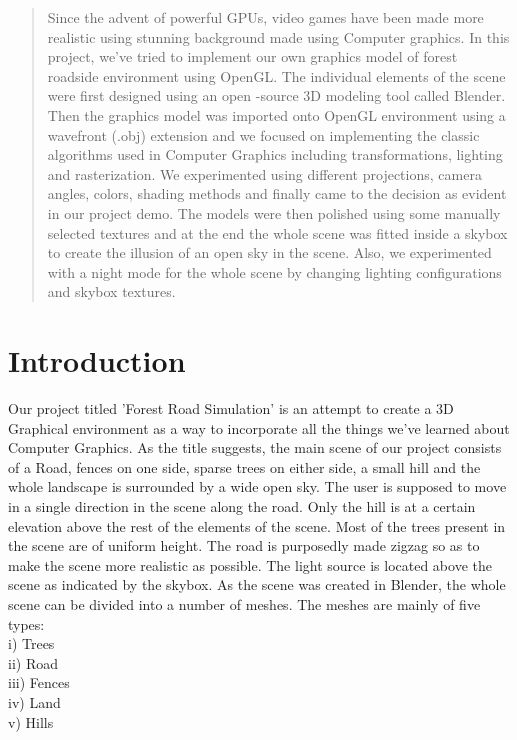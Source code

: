 \documentclass{report}
\begin{document}
\tableofcontents
\listoffigures

\begin{abstract}
    Since the advent of powerful GPUs, video games have been made more realistic using stunning background 
    made using Computer graphics. In this project, we've tried to implement our own graphics model of forest 
    roadside environment using OpenGL. The individual elements of the scene were first designed using an open
    -source 3D modeling tool called Blender. Then the graphics model was imported onto OpenGL environment 
    using a wavefront (.obj) extension and we focused on implementing the classic algorithms used in Computer
    Graphics including transformations, lighting and rasterization. We experimented using different projections, 
    camera angles, colors, shading methods and finally came to the decision as evident in our project demo.
    The models were then polished using some 
    manually selected textures and at the end the whole scene was fitted inside a skybox to create the illusion 
    of an open sky in the scene. Also, we experimented with a night mode for the whole scene by changing
    lighting configurations and skybox textures.
\end{abstract}

\section{Introduction}

    Our project titled 'Forest Road Simulation' is an attempt to create a 3D Graphical environment as a 
    way to incorporate all the things we've learned about Computer Graphics. As the title suggests, the 
    main scene of our project consists of a Road, fences on one side, sparse trees on either side, a small
    hill and the whole landscape is surrounded by a wide open sky. The user is supposed to move in a 
    single direction in the scene along the road. Only the hill is at a certain elevation above the rest 
    of the elements of the scene. Most of the trees present in the scene are of uniform height. The road 
    is purposedly made zigzag so as to make the scene more realistic as possible. The light source is located 
    above the scene as indicated by the skybox. As the scene was created in Blender, the whole scene can 
    be divided into a number of meshes. The meshes are mainly of five types:
    \\i) Trees 
    \\ii) Road 
    \\iii) Fences 
    \\iv) Land 
    \\v) Hills
\end{document}
